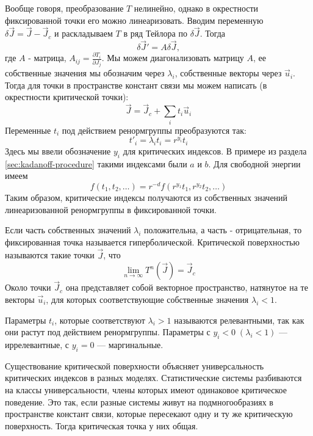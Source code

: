 \documentclass[a4paper,12pt]{article}
\theoremstyle{definition}
\theoremstyle{definition}
\theoremstyle{definition}
\begin{document}
Вообще говоря, преобразование $T$ нелинейно, однако в окрестности фиксированной точки его можно линеаризовать. Вводим переменную $\delta\vec J=\vec J-\vec J_c$ и раскладываем $T$ в ряд Тейлора по $\delta\vec J$. Тогда
\begin{equation}
  \label{eq:59}
  \delta\vec J'=A\delta\vec J,
\end{equation}
где $A$ - матрица, $A_{ij}=\frac{\partial T_i}{\partial J_j}$. Мы можем диагонализовать матрицу $A$, ее собственные значения мы обозначим через $\lambda_i$, собственные векторы через $\vec u_i$. Тогда для точки в пространстве констант связи мы можем написать (в окрестности  критической точки):
\begin{equation}
  \label{eq:60}
  \vec J=\vec J_c+\sum_i t_i \vec u_i
\end{equation}
Переменные $t_i$ под действием ренормгруппы преобразуются так:
\begin{equation}
  \label{eq:61}
  t'_i=\lambda_i t_i=r^{y_i} t_i
\end{equation}
Здесь мы ввели обозначение $y_i$ для критических индексов. В примере из раздела \ref{sec:kadanoff-procedure} такими индексами были $a$ и $b$. 
Для свободной энергии имеем
\begin{equation}
  \label{eq:62}
  f(t_1,t_2,\dots)=r^{-d} f(r^{y_1}t_1,r^{y_2}t_2,\dots)
\end{equation}
Таким образом, критические индексы получаются из собственных значений линеаризованной ренормгруппы в фиксированной точки.

Если часть собственных значений $\lambda_i$ положительна, а часть - отрицательная, то фиксированная точка называется гиперболической. 
Критической поверхностью называются такие точки $\vec J$, что
\begin{equation}
  \label{eq:63}
  \lim_{n\to \infty}T^n (\vec J)=\vec J_c
\end{equation}
Около точки $\vec J_c$ она представляет собой векторное пространство, натянутое на те векторы $\vec u_i$, для которых соответствующие собственные значения $\lambda_i<1$. 

Параметры $t_i$, которые соответствуют $\lambda_i>1$ называются релевантными, так как они растут под действием ренормгруппы. Параметры с $y_i<0 \; (\lambda_i<1)$ --- иррелевантные, с $y_i=0$ --- маргинальные.

Существование критической поверхности объясняет универсальность критических индексов в разных моделях. Статистические системы разбиваются на классы универсальности, члены которых имеют одинаковое критическое поведение. Это так, если разные системы живут на подмногообразиях в пространстве констант связи, которые пересекают одну и ту же критическую поверхность. Тогда критическая точка у них общая.
\end{document}
